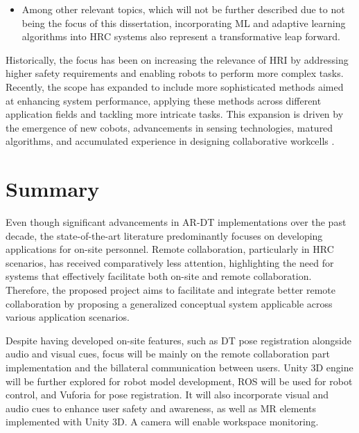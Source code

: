 \begin{itemize}
    \item Among other relevant topics, which will not be further described due to not being the focus of this dissertation, incorporating \ac{ML} and adaptive learning algorithms into \ac{HRC} systems also represent a transformative leap forward.
\end{itemize}


Historically, the focus has been on increasing the relevance of \ac{HRI} by addressing higher safety requirements and enabling 
robots to perform more complex tasks. Recently, the scope has expanded to include more sophisticated methods aimed at enhancing system performance, 
applying these methods across different application fields and tackling more intricate tasks. This expansion is driven by the emergence of new 
cobots, advancements in sensing technologies, matured algorithms, and accumulated experience in designing collaborative workcells \cite{robotics8040100}.

\section{Summary}

Even though significant advancements in \ac{AR}-\ac{DT} implementations over the past decade, the state-of-the-art literature predominantly focuses on developing applications for on-site personnel. Remote collaboration, particularly in \ac{HRC} scenarios, has received comparatively less attention, highlighting the need for systems that effectively facilitate both on-site and remote collaboration. Therefore, the proposed project aims to facilitate and integrate better remote collaboration by proposing a generalized conceptual system applicable across various application scenarios.

Despite having developed on-site features, such as \ac{DT} pose registration alongside audio and visual cues, focus will be mainly on the remote collaboration part implementation and the billateral communication between users. Unity 3D engine will be further explored for robot model development, \ac{ROS} will be used for robot control, and Vuforia for pose registration. It will also incorporate visual and audio cues to enhance user safety and awareness, as well as \ac{MR} elements implemented with Unity 3D. A camera will enable workspace monitoring. 


